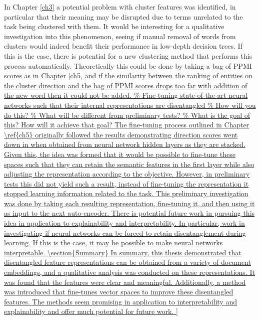 In Chapter \ref{ch3} a potential problem with cluster features was identified, in particular that their  meaning may be disrupted due to terms unrelated to the task being clustered with them. It would be interesting for a qualitative investigation into this phenomenon, seeing if manual removal of words from clusters would indeed benefit their performance in low-depth decision trees. If this is the case, there is potential for a new clustering method that performs this process automatically. Theoretically this could be done by taking a bag of PPMI scores as in Chapter \ref{ch5, and if the similarity between the ranking of entities on the cluster direction and the bag of PPMI scores drops too far with addition of the new word then it could not be added. 




The fine-tuning process outlined in Chapter \ref{ch5} originally followed the results demonstrating  direction scores went down in when obtained from neural network hidden layers as they are  stacked. Given this, the idea was formed that it would be possible to fine-tune these spaces such that they can retain the semantic features in the first layer while also adjusting the representation according to the objective. However, in preliminary tests this did not yield such a result, instead of fine-tuning the representation it stopped learning information related to the task. This preliminary investigation was done by taking each resulting representation, fine-tuning it, and then using it as input to the next auto-encoder. There is potential future work in pursuing this idea in application to explainability and interpretability. In particular, work in investigating if neural networks can be forced to retain disentanglement during learning. If this is the case, it may be possible to make neural networks interpretable.




\section{Summary}

In summary, this thesis demonstrated that disentangled feature representations can be obtained from a variety of document embeddings, and a qualitative analysis was conducted on these representations. It was found that the features were clear and meaningful. Additionally, a method was introduced that fine-tunes vector spaces to improve these disentangled features. The methods seem promising in application to interpretability and explainability and offer much potential for future work.

}
